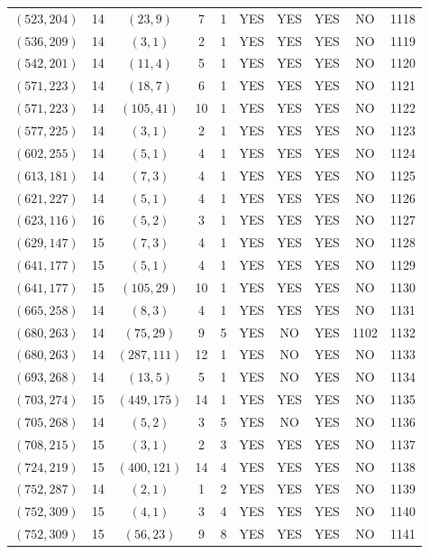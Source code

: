 \begin{longtable}{|c|c|c|c|c|c|c|c|c|c|}
$(523, 204)$ & 14 & $(23, 9)$ & 7 & 1 & YES & YES & YES & NO & 1118\\
$(536, 209)$ & 14 & $(3, 1)$ & 2 & 1 & YES & YES & YES & NO & 1119\\
$(542, 201)$ & 14 & $(11, 4)$ & 5 & 1 & YES & YES & YES & NO & 1120\\
$(571, 223)$ & 14 & $(18, 7)$ & 6 & 1 & YES & YES & YES & NO & 1121\\
$(571, 223)$ & 14 & $(105, 41)$ & 10 & 1 & YES & YES & YES & NO & 1122\\
$(577, 225)$ & 14 & $(3, 1)$ & 2 & 1 & YES & YES & YES & NO & 1123\\
$(602, 255)$ & 14 & $(5, 1)$ & 4 & 1 & YES & YES & YES & NO & 1124\\
$(613, 181)$ & 14 & $(7, 3)$ & 4 & 1 & YES & YES & YES & NO & 1125\\
$(621, 227)$ & 14 & $(5, 1)$ & 4 & 1 & YES & YES & YES & NO & 1126\\
$(623, 116)$ & 16 & $(5, 2)$ & 3 & 1 & YES & YES & YES & NO & 1127\\
$(629, 147)$ & 15 & $(7, 3)$ & 4 & 1 & YES & YES & YES & NO & 1128\\
$(641, 177)$ & 15 & $(5, 1)$ & 4 & 1 & YES & YES & YES & NO & 1129\\
$(641, 177)$ & 15 & $(105, 29)$ & 10 & 1 & YES & YES & YES & NO & 1130\\
$(665, 258)$ & 14 & $(8, 3)$ & 4 & 1 & YES & YES & YES & NO & 1131\\
$(680, 263)$ & 14 & $(75, 29)$ & 9 & 5 & YES & NO & YES & 1102 & 1132\\
$(680, 263)$ & 14 & $(287, 111)$ & 12 & 1 & YES & NO & YES & NO & 1133\\
$(693, 268)$ & 14 & $(13, 5)$ & 5 & 1 & YES & NO & YES & NO & 1134\\
$(703, 274)$ & 15 & $(449, 175)$ & 14 & 1 & YES & YES & YES & NO & 1135\\
$(705, 268)$ & 14 & $(5, 2)$ & 3 & 5 & YES & NO & YES & NO & 1136\\
$(708, 215)$ & 15 & $(3, 1)$ & 2 & 3 & YES & YES & YES & NO & 1137\\
$(724, 219)$ & 15 & $(400, 121)$ & 14 & 4 & YES & YES & YES & NO & 1138\\
$(752, 287)$ & 14 & $(2, 1)$ & 1 & 2 & YES & YES & YES & NO & 1139\\
$(752, 309)$ & 15 & $(4, 1)$ & 3 & 4 & YES & YES & YES & NO & 1140\\
$(752, 309)$ & 15 & $(56, 23)$ & 9 & 8 & YES & YES & YES & NO & 1141\\

\end{longtable}
